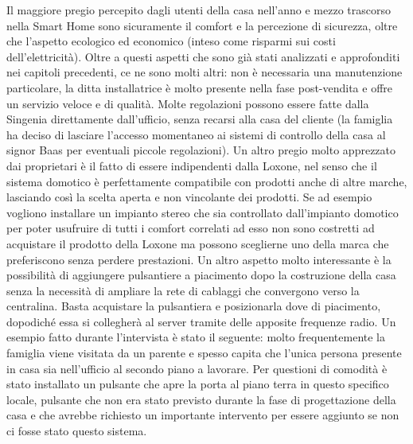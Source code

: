 Il maggiore pregio percepito dagli utenti della casa nell’anno e mezzo trascorso nella Smart Home sono sicuramente il comfort e la percezione di sicurezza, oltre che l’aspetto ecologico ed economico (inteso come risparmi sui costi dell’elettricità). Oltre a questi aspetti che sono già stati analizzati e approfonditi nei capitoli precedenti, ce ne sono molti altri: non è necessaria una manutenzione particolare, la ditta installatrice è molto presente nella fase post-vendita e offre un servizio veloce e di qualità. Molte regolazioni possono essere fatte dalla Singenia direttamente dall’ufficio, senza recarsi alla casa del cliente (la famiglia ha deciso di lasciare l’accesso momentaneo ai sistemi di controllo della casa al signor Baas per eventuali piccole regolazioni). Un altro pregio molto apprezzato dai proprietari è il fatto di essere indipendenti dalla Loxone, nel senso che il sistema domotico è perfettamente compatibile con prodotti anche di altre marche, lasciando così la scelta aperta e non vincolante dei prodotti. Se ad esempio vogliono installare un impianto stereo che sia controllato dall’impianto domotico per poter usufruire di tutti i comfort correlati ad esso non sono costretti ad acquistare il prodotto della Loxone ma possono sceglierne uno della marca che preferiscono senza perdere prestazioni.
Un altro aspetto molto interessante è la possibilità di aggiungere pulsantiere a piacimento dopo la costruzione della casa senza la necessità di ampliare la rete di cablaggi che convergono verso la centralina. Basta acquistare la pulsantiera e posizionarla dove di piacimento, dopodiché essa si collegherà al server tramite delle apposite frequenze radio. Un esempio fatto durante l’intervista è stato il seguente: molto frequentemente la famiglia viene visitata da un parente e spesso capita che l’unica persona presente in casa sia nell’ufficio al secondo piano a lavorare. Per questioni di comodità è stato installato un pulsante che apre la porta al piano terra in questo specifico locale, pulsante che non era stato previsto durante la fase di progettazione della casa e che avrebbe richiesto un importante intervento per essere aggiunto se non ci fosse stato questo sistema. 
